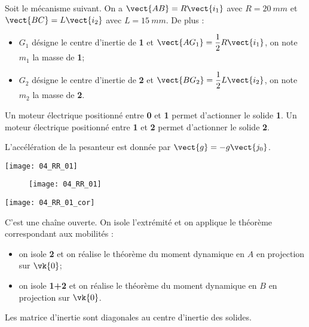 \normaltrue
\correctiontrue


\setcounter{question}{0}%
\ifcorrection
\else
{}
\fi

\ifprof
\else
Soit le mécanisme suivant. On a $\vect{AB}=R\vect{i_1}$ avec $R=\SI{20}{mm}$ et  
$\vect{BC}=L\vect{i_2}$ avec $L=\SI{15}{mm}$. De plus :
\begin{itemize}
\item $G_1$ désigne le centre d'inertie de \textbf{1} et $\vect{AG_1}=\dfrac{1}{2}R\vect{i_1}$, on note $m_1$ la masse de \textbf{1}; %
\item $G_2$ désigne le centre d'inertie de \textbf{2} et $\vect{BG_2}=\dfrac{1}{2}L\vect{i_2}$, on note $m_2$ la masse de \textbf{2}.%
\end{itemize}

Un moteur électrique positionné entre \textbf{0} et \textbf{1} permet d'actionner le solide \textbf{1}.
Un moteur électrique positionné entre \textbf{1} et \textbf{2} permet d'actionner le solide \textbf{2}.

L'accélération de la pesanteur est donnée par $\vect{g}=-g\vect{j_0}$.


\fi
\ifprof
\begin{marginfigure}
\texttt{[image: 04\_RR\_01]}
\end{marginfigure}
\else

\begin{figure}[!h]
\centering
\texttt{[image: 04\_RR\_01]}
\end{figure}
\fi



\ifprof

\begin{marginfigure}
\texttt{[image: 04\_RR\_01\_cor]}
\end{marginfigure}
\else
\fi

\ifprof
C'est une chaîne ouverte. On isole l'extrémité et on applique le théorème correspondant aux mobilités : 
\begin{itemize}
\item on isole \textbf{2} et on réalise le théorème du moment dynamique en $A$ en projection sur $\vk{0}$;
\item on isole \textbf{1+2} et on réalise le théorème du moment dynamique en $B$ en projection sur $\vk{0}$.
\end{itemize}
\else
\fi


\ifcolle
Les matrice d'inertie sont diagonales au centre d'inertie des solides.

\else
\fi

\ifprof
\else


\fi